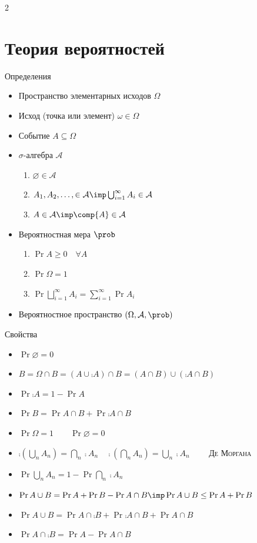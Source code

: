 \documentclass[landscape]{article}
\begin{document}
\begin{multicols*}{2}

\section{Теория вероятностей}

Определения
\begin{itemize}
  \item Пространство элементарных исходов $\Omega$
  \item Исход (точка или элемент) $\omega \in \Omega$
  \item Событие $A \subseteq \Omega$
  \item $\sigma$-алгебра $\mathcal{A}$
    \begin{enumerate}
      \item $\varnothing \in \mathcal{A}$
      \item $A_1,A_2,\dots, \in \mathcal{A}
        \imp \bigcup_{i=1}^\infty A_i \in \mathcal{A}$
      \item $A \in \mathcal{A} \imp \comp{A} \in \mathcal{A}$
    \end{enumerate}
  \item Вероятностная мера $\prob$
    \begin{enumerate}
      \item $\Pr{A} \ge 0 \quad \forall A$
      \item $\Pr{\Omega} = 1$
      \item $\Pr{\displaystyle\bigsqcup_{i=1}^\infty A_i}
        = \displaystyle\sum_{i=1}^\infty \Pr{A_i}$
    \end{enumerate}
  \item Вероятностное пространство $(\Omega,\mathcal{A},\prob)$
\end{itemize}

Свойства
\begin{itemize}
  \item $\Pr{\varnothing} = 0$
  \item $B = \Omega \cap B = (A \cup \comp{A}) \cap B
    = (A \cap B) \cup (\comp{A} \cap B)$
  \item $\Pr{\comp{A}} = 1 - \Pr{A}$
  \item $\Pr{B} = \Pr{A \cap B} + \Pr{\comp{A} \cap B}$
  \item $\Pr{\Omega} = 1 \qquad \Pr{\varnothing} = 0$
  \item $\comp{\left(\bigcup_n A_n\right)} = \bigcap_n \comp{A_n}
    \quad
    \comp{\left(\bigcap_n A_n\right)} = \bigcup_n \comp{A_n}
    \qquad$
    \textsc{Де Моргана}
  \item $\Pr{\bigcup_n A_n}
    = 1 - \Pr{\bigcap_n \comp{A_n}}$
  \item $\Pr{A \cup B} = \Pr{A} + \Pr{B} - \Pr{A \cap B}\\[1ex]
    \imp \Pr{A \cup B} \le \Pr{A} + \Pr{B}$
  \item $\Pr{A \cup B}
    = \Pr{A \cap \comp{B}} + \Pr{\comp{A} \cap B} + \Pr{A \cap B}$
  \item $\Pr{A \cap \comp{B}} = \Pr{A} - \Pr{A \cap B}$
\end{itemize}


\end{multicols*}
\end{document}
